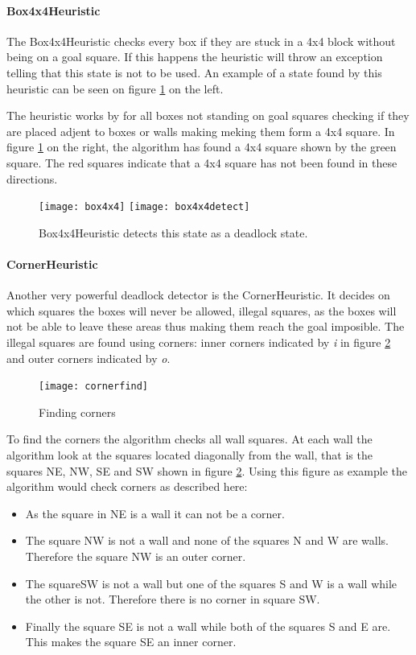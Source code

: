 \paragraph{Box4x4Heuristic}The Box4x4Heuristic checks every box if
they are stuck in a 4x4 block without being on a goal square. If this
happens the heuristic will throw an exception telling that this state
is not to be used. An example of a state found by this heuristic can
be seen on figure \ref{fig:box4x4} on the left.

The heuristic works by for all boxes not standing on goal squares
checking if they are placed adjent to boxes or walls making meking
them form a 4x4 square. In figure \ref{fig:box4x4} on the right, the
algorithm has found a 4x4 square shown by the green square. The red
squares indicate that a 4x4 square has not been found in these
directions.

\begin{figure}[htp]
  \centering
  \texttt{[image: box4x4]}
  \texttt{[image: box4x4detect]}
  \caption{Box4x4Heuristic detects this state as a deadlock state.}
  \label{fig:box4x4}
\end{figure}

\paragraph{CornerHeuristic}Another very powerful deadlock detector is
\label{sec:cornerheur}
the CornerHeuristic. It decides on which squares the boxes will never
be allowed, illegal squares, as the boxes will not be able to leave
these areas thus making them reach the goal imposible. The illegal
squares are found using corners: inner corners indicated by \textit{i}
in figure \ref{fig:cornerheuristic} and outer corners indicated by
\textit{o}.
\begin{figure}[htp]
  \centering
  \texttt{[image: cornerfind]}
  \caption{Finding corners}
  \label{fig:cornerheuristic}
\end{figure}
To find the corners the algorithm checks all wall squares. At each
wall the algorithm look at the squares located diagonally from the
wall, that is the squares NE, NW, SE and SW shown in figure
\ref{fig:cornerheuristic}. Using this figure as example the algorithm
would check corners as described here:
\begin{itemize}
\item As the square in NE is a wall it can not be a corner.
\item The square NW is not a wall and none of the squares N and W are
  walls. Therefore the square NW is an outer corner.
\item The squareSW is not a wall but one of the squares S and W is a
  wall while the other is not. Therefore there is no corner in square
  SW.
\item Finally the square SE is not a wall while both of the squares S
  and E are. This makes the square SE an inner corner.
\end{itemize}

